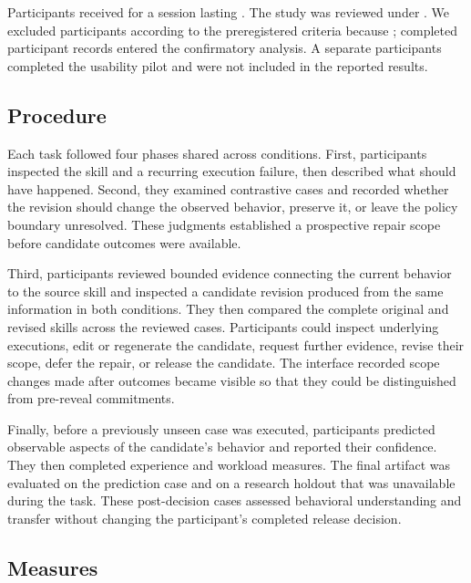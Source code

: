 Participants received \StudyCompensation{} for a session lasting
. The study was reviewed
under \StudyEthics{}. We excluded  participants according
to the preregistered criteria because ;
 completed participant records entered the confirmatory
analysis. A separate  participants completed the usability
pilot and were not included in the reported results.

\subsection{Procedure}

Each task followed four phases shared across conditions. First, participants
inspected the skill and a recurring execution failure, then described what
should have happened. Second, they examined contrastive cases and recorded
whether the revision should change the observed behavior, preserve it, or
leave the policy boundary unresolved. These judgments established a
prospective repair scope before candidate outcomes were available.

Third, participants reviewed bounded evidence connecting the current behavior to
the source skill and inspected a candidate revision produced from the same
information in both conditions. They then compared the complete original and
revised skills across the reviewed cases. Participants could inspect
underlying executions, edit or regenerate the candidate, request further
evidence, revise their scope, defer the repair, or release the candidate. The
interface recorded scope changes made after outcomes became visible so that
they could be distinguished from pre-reveal commitments.

Finally, before a previously unseen case was executed, participants predicted
observable aspects of the candidate's behavior and reported their confidence.
They then completed experience and workload measures. The final artifact was
evaluated on the prediction case and on a research holdout that was unavailable
during the task. These post-decision cases assessed behavioral understanding
and transfer without changing the participant's completed release decision.

\subsection{Measures}

